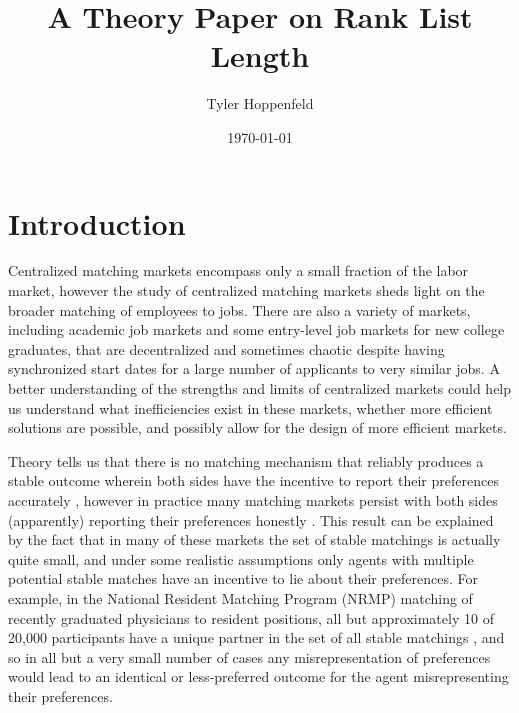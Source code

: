 \documentclass[WP]{AEA}
\begin{document}
\title{A Theory Paper on Rank List Length}
\author{Tyler Hoppenfeld}
\date{\today}
\JEL{}
\Keywords{}


\maketitle


\section{Introduction}

Centralized matching markets  encompass only a small fraction of the labor market, however the study of centralized matching markets  sheds light on the broader matching of employees to jobs. There are also a variety of markets, including academic job markets and some entry-level job markets for new college graduates, that are decentralized and sometimes chaotic despite having synchronized start dates for a large number of applicants to very similar jobs. A better understanding of the strengths and limits of centralized markets could help us understand what inefficiencies exist in these markets, whether more efficient solutions are possible, and possibly allow for the design of more efficient markets. 

Theory tells us that there is no matching mechanism that reliably produces a stable outcome wherein both sides have the incentive to report their preferences accurately \citep{Roth1985}, however in practice many matching markets persist with both sides (apparently) reporting their preferences honestly  \citep{Roth1991}. This result can be explained by the fact that in many of these markets the set of stable matchings is actually quite small, and under some realistic assumptions only agents with multiple potential stable matches have an incentive to lie about their preferences.  For example, in the National Resident Matching Program (NRMP) matching of recently graduated physicians to resident positions, all but approximately 10 of 20,000 participants have a unique partner in the set of all stable matchings \citep{Roth1999a}, and so in all but a very small number of cases any misrepresentation of preferences would lead to an identical or less-preferred outcome for the agent misrepresenting their preferences. 
\end{document}
